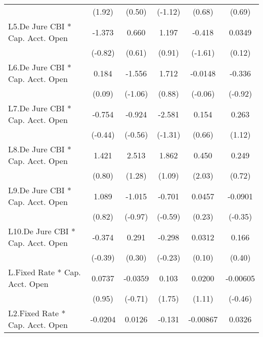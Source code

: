 {\begin{longtable}{l*{5}{c}}
                &   (1.92)         &   (0.50)         &  (-1.12)         &   (0.68)         &   (0.69)         \\
[1em]
L5.De Jure CBI * Cap. Acct. Open&   -1.373         &    0.660         &    1.197         &   -0.418         &   0.0349         \\
                &  (-0.82)         &   (0.61)         &   (0.91)         &  (-1.61)         &   (0.12)         \\
[1em]
L6.De Jure CBI * Cap. Acct. Open&    0.184         &   -1.556         &    1.712         &  -0.0148         &   -0.336         \\
                &   (0.09)         &  (-1.06)         &   (0.88)         &  (-0.06)         &  (-0.92)         \\
[1em]
L7.De Jure CBI * Cap. Acct. Open&   -0.754         &   -0.924         &   -2.581         &    0.154         &    0.263         \\
                &  (-0.44)         &  (-0.56)         &  (-1.31)         &   (0.66)         &   (1.12)         \\
[1em]
L8.De Jure CBI * Cap. Acct. Open&    1.421         &    2.513         &    1.862         &    0.450\sym{*}  &    0.249         \\
                &   (0.80)         &   (1.28)         &   (1.09)         &   (2.03)         &   (0.72)         \\
[1em]
L9.De Jure CBI * Cap. Acct. Open&    1.089         &   -1.015         &   -0.701         &   0.0457         &  -0.0901         \\
                &   (0.82)         &  (-0.97)         &  (-0.59)         &   (0.23)         &  (-0.35)         \\
[1em]
L10.De Jure CBI * Cap. Acct. Open&   -0.374         &    0.291         &   -0.298         &   0.0312         &    0.166         \\
                &  (-0.39)         &   (0.30)         &  (-0.23)         &   (0.10)         &   (0.40)         \\
[1em]
L.Fixed Rate * Cap. Acct. Open&   0.0737         &  -0.0359         &    0.103         &   0.0200         & -0.00605         \\
                &   (0.95)         &  (-0.71)         &   (1.75)         &   (1.11)         &  (-0.46)         \\
[1em]
L2.Fixed Rate * Cap. Acct. Open&  -0.0204         &   0.0126         &   -0.131         & -0.00867         &   0.0326\sym{**} \\

\end{longtable}}

